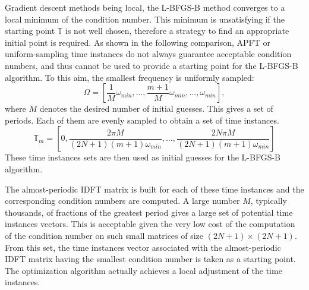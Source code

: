 Gradient descent methods being local, the L-BFGS-B method converges to a local
minimum of the condition number. This minimum is unsatisfying if the
starting point $\mathbb{T}$ is not well chosen, therefore a strategy
to find an appropriate initial point is required.  As shown in the following
comparison, APFT or uniform-sampling time instances do not always
guarantee acceptable condition numbers, and thus cannot be used to
provide a starting point for the L-BFGS-B algorithm. To this aim, the smallest
frequency is uniformly sampled:
\begin{equation}
    \Omega = [\frac{1}{M} \omega_{min}, \ldots, \frac{m+1}{M} \omega_{min}, \ldots, \omega_{min}],
    \label{eq:slitted_period}
\end{equation}
where $M$ denotes the desired number of initial guesses.
This gives a set of periods. Each of them are evenly sampled to obtain a
set of time instances. 
\begin{equation}
    \mathbb{T}_m = \left[ 0, \frac{2 \pi M}{ (2N + 1) (m+1) \omega_{min}}, \ldots, 
                             \frac{2N \pi M}{ (2N + 1) (m+1) \omega_{min}} \right]
    \label{eq:set_of_tlv}
\end{equation}
These time instances sets are then used as initial guesses for the
L-BFGS-B algorithm.

The almost-periodic IDFT matrix is built for
each of these time instances and the corresponding condition numbers are
computed. A large number $M$, typically thousands, of fractions of the
greatest period gives a large set of potential time instances vectors.
This is acceptable given the very low cost of the computation of the
condition number on such small matrices of size $(2N + 1) \times
(2N+1)$.  From this set, the time instances vector associated with the
almost-periodic IDFT matrix having the smallest condition number is
taken as a starting point.  The optimization algorithm actually achieves
a local adjustment of the time instances.

